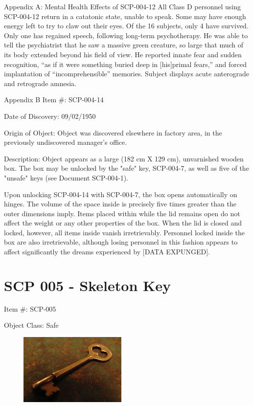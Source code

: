 \documentclass[a4paper, 11pt]{article}
\newcommand{\lb}{\ensuremath{[}}
\newcommand{\rb}{\ensuremath{]}}
\newcommand{\expunged}{\lb DATA EXPUNGED\rb}
\begin{document}
Appendix A: Mental Health Effects of SCP-004-12
All Class D personnel using SCP-004-12 return in a catatonic state, unable to speak. Some may have enough energy left to try to claw out their eyes. Of the 16 subjects, only 4 have survived. Only one has regained speech, following long-term psychotherapy. He was able to tell the psychiatrist that he saw a massive green creature, so large that much of its body extended beyond his field of view. He reported innate fear and sudden recognition, “as if it were something buried deep in \lb his\rb primal fears,” and forced implantation of “incomprehensible” memories. Subject displays acute anterograde and retrograde amnesia.

Appendix B
Item \#: SCP-004-14

Date of Discovery: 09/02/1950

Origin of Object: Object was discovered elsewhere in factory area, in the previously undiscovered manager's office.

Description: Object appears as a large (182 cm X 129 cm), unvarnished wooden box. The box may be unlocked by the "safe" key, SCP-004-7, as well as five of the "unsafe" keys (see Document SCP-004-1).

Upon unlocking SCP-004-14 with SCP-004-7, the box opens automatically on hinges. The volume of the space inside is precisely five times greater than the outer dimensions imply. Items placed within while the lid remains open do not affect the weight or any other properties of the box. When the lid is closed and locked, however, all items inside vanish irretrievably. Personnel locked inside the box are also irretrievable, although losing personnel in this fashion appears to affect significantly the dreams experienced by \expunged.

\newpage
\section{SCP 005 - Skeleton Key}
Item \#: SCP-005

Object Class: Safe

\begin{figure}
\includegraphics[scale=1]{img/scp/005.jpg}
\end{figure}
\end{document}
